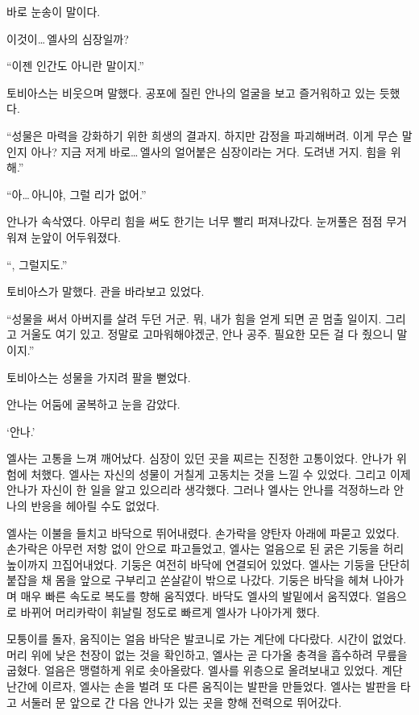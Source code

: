바로 눈송이 말이다.

이것이\ldots\,엘사의 심장일까?

``이젠 인간도 아니란 말이지.''

토비아스는 비웃으며 말했다. 공포에 질린 안나의 얼굴을 보고 즐거워하고 있는 듯했다.

``성물은 마력을 강화하기 위한 희생의 결과지. 하지만 감정을 파괴해버려. 이게 무슨 말인지 아나? 지금 저게 바로\ldots\,엘사의 얼어붙은 심장이라는 거다. 도려낸 거지. 힘을 위해.''

``아\ldots\,아니야, 그럴 리가 없어.''

안나가 속삭였다. 아무리 힘을 써도 한기는 너무 빨리 퍼져나갔다. 눈꺼풀은 점점 무거워져 눈앞이 어두워졌다.

``, 그럴지도.''

토비아스가 말했다. 관을 바라보고 있었다.

``성물을 써서 아버지를 살려 두던 거군. 뭐, 내가 힘을 얻게 되면 곧 멈출 일이지. 그리고 거울도 여기 있고. 정말로 고마워해야겠군, 안나 공주. 필요한 모든 걸 다 줬으니 말이지.''

토비아스는 성물을 가지려 팔을 뻗었다.

안나는 어둠에 굴복하고 눈을 감았다.

\textbreak

\forceindent`안나.'

엘사는 고통을 느껴 깨어났다. 심장이 있던 곳을 찌르는 진정한 고통이었다. 안나가 위험에 처했다. 엘사는 자신의 성물이 거칠게 고동치는 것을 느낄 수 있었다. 그리고 이제 안나가 자신이 한 일을 알고 있으리라 생각했다. 그러나 엘사는 안나를 걱정하느라 안나의 반응을 헤아릴 수도 없었다.

엘사는 이불을 들치고 바닥으로 뛰어내렸다. 손가락을 양탄자 아래에 파묻고 있었다. 손가락은 아무런 저항 없이 안으로 파고들었고, 엘사는 얼음으로 된 굵은 기둥을 허리 높이까지 끄집어내었다. 기둥은 여전히 바닥에 연결되어 있었다. 엘사는 기둥을 단단히 붙잡을 채 몸을 앞으로 구부리고 쏜살같이 밖으로 나갔다. 기둥은 바닥을 헤쳐 나아가며 매우 빠른 속도로 복도를 향해 움직였다. 바닥도 엘사의 발밑에서 움직였다. 얼음으로 바뀌어 머리카락이 휘날릴 정도로 빠르게 엘사가 나아가게 했다.

모퉁이를 돌자, 움직이는 얼음 바닥은 발코니로 가는 계단에 다다랐다. 시간이 없었다. 머리 위에 낮은 천장이 없는 것을 확인하고, 엘사는 곧 다가올 충격을 흡수하려 무릎을 굽혔다. 얼음은 맹렬하게 위로 솟아올랐다. 엘사를 위층으로 올려보내고 있었다. 계단 난간에 이르자, 엘사는 손을 벌려 또 다른 움직이는 발판을 만들었다. 엘사는 발판을 타고 서둘러 문 앞으로 간 다음 안나가 있는 곳을 향해 전력으로 뛰어갔다.

